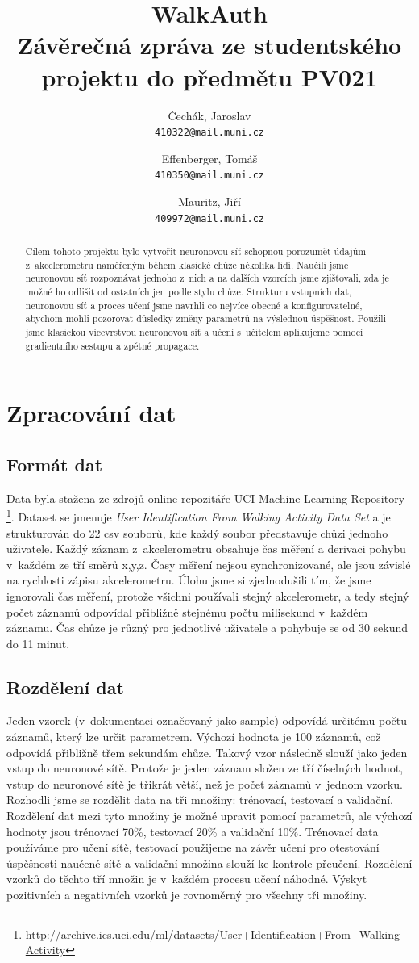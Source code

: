 \documentclass[a4paper, 10pt, twocolumn]{article}
\title{WalkAuth\\
\large Závěrečná zpráva ze studentského projektu do předmětu PV021
}
\author{Čechák, Jaroslav\\
	\texttt{410322@mail.muni.cz}
	\and
	Effenberger, Tomáš\\
	\texttt{410350@mail.muni.cz}
	\and
	Mauritz, Jiří\\
	\texttt{409972@mail.muni.cz}
}
\date{}
\begin{document}
\twocolumn[\maketitle ]


\begin{abstract}
  Cílem tohoto projektu bylo vytvořit neuronovou síť schopnou porozumět údajům z~akcelerometru naměřeným během klasické chůze několika lidí. Naučili jsme neuronovou síť rozpoznávat jednoho z~nich a na dalších vzorcích jsme zjišťovali, zda je možné ho odlišit od ostatních jen podle stylu chůze. Strukturu vstupních dat, neuronovou síť a proces učení jsme navrhli co nejvíce obecné a konfigurovatelné, abychom mohli pozorovat důsledky změny parametrů na výslednou úspěšnost. Použili jsme klasickou vícevrstvou neuronovou síť a učení s~učitelem aplikujeme pomocí gradientního sestupu a zpětné propagace.
\end{abstract}

\section{Zpracování dat}
    \subsection{Formát dat}
        Data byla stažena ze zdrojů online repozitáře UCI Machine Learning Repository \footnote{\url{http://archive.ics.uci.edu/ml/datasets/User+Identification+From+Walking+Activity}}. Dataset se jmenuje \textit{User Identification From Walking Activity Data Set}  a je strukturován do 22 csv souborů, kde každý soubor představuje chůzi jednoho uživatele. Každý záznam z~akcelerometru obsahuje čas měření a derivaci pohybu v~každém ze tří směrů x,y,z. Časy měření nejsou synchronizované, ale jsou závislé na rychlosti zápisu akcelerometru. Úlohu jsme si zjednodušili tím, že jsme ignorovali čas měření, protože všichni používali stejný akcelerometr, a tedy stejný počet záznamů odpovídal přibližně stejnému počtu milisekund v~každém záznamu. Čas chůze je různý pro jednotlivé uživatele a pohybuje se od 30 sekund do 11 minut.
    \subsection{Rozdělení dat}\label{rozdeleni_dat}
        Jeden vzorek (v~dokumentaci označovaný jako sample) odpovídá určitému počtu záznamů, který lze určit parametrem. Výchozí hodnota je 100 záznamů, což odpovídá přibližně třem sekundám chůze. Takový vzor následně slouží jako jeden vstup do neuronové sítě. Protože je jeden záznam složen ze tří číselných hodnot, vstup do neuronové sítě je třikrát větší, než je počet záznamů v~jednom vzorku.
        Rozhodli jsme se rozdělit data na tři množiny: trénovací, testovací a validační. Rozdělení dat mezi tyto množiny je možné upravit pomocí parametrů, ale výchozí hodnoty jsou trénovací 70\%, testovací 20\% a validační 10\%. Trénovací data používáme pro učení sítě, testovací použijeme na závěr učení pro otestování úspěšnosti naučené sítě a validační množina slouží ke kontrole přeučení. Rozdělení vzorků do těchto tří množin je v~každém procesu učení náhodné. Výskyt pozitivních a negativních vzorků je rovnoměrný pro všechny tři množiny.
\end{document}
